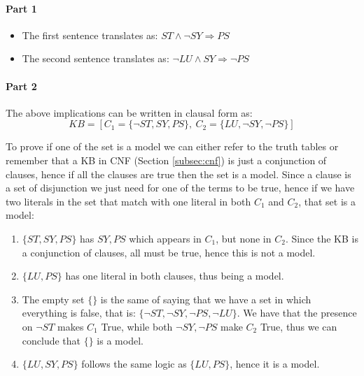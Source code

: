 \documentclass[10pt,a4paper]{article}
\begin{document}
\begin{enumerate}
\paragraph{Part 1}
\begin{itemize}
\item The first sentence translates as: $ST \wedge \neg SY \Rightarrow PS$
\item The second sentence translates as: $\neg LU \wedge SY \Rightarrow \neg PS$
\end{itemize}

\paragraph{Part 2}
The above implications can be written in clausal form as:
\[KB=[ C_1=\lbrace \neg ST, SY, PS \rbrace,\ C_2=\lbrace LU, \neg SY, \neg PS \rbrace]\]


To prove if one of the set is a model we can either refer to the truth tables or remember that a KB in CNF (Section \ref{subsec:cnf}) is just a conjunction of clauses, hence if all the clauses are true then the set is a model. Since a clause is a set of disjunction we just need for one of the terms to be true, hence if we have two literals in the set that match with one literal in both $C_1$ and $C_2$, that set is a model:
 

\begin{enumerate}

\item $\lbrace ST,SY,PS\rbrace$ has $SY,PS$ which appears in $C_1$, but none in $C_2$. Since the KB is a conjunction of clauses, all must be true, hence this is not a model.
\item $\lbrace LU,PS\rbrace$ has one literal in both clauses, thus being a model.
\item The empty set $\lbrace \rbrace$ is the same of saying that we have a set in which everything is false, that is: $\lbrace  \neg ST, \neg SY, \neg PS, \neg LU\rbrace$. We have that the presence on $\neg ST$ makes $C_1$ True, while both $\neg SY, \neg PS$ make $C_2$ True, thus we can conclude that $\lbrace \rbrace$  is a model.
\item $ \lbrace LU,SY,PS\rbrace$ follows the same logic as $\lbrace LU,PS\rbrace$, hence it is a model.
\end{enumerate}


\end{enumerate}
\end{document}
